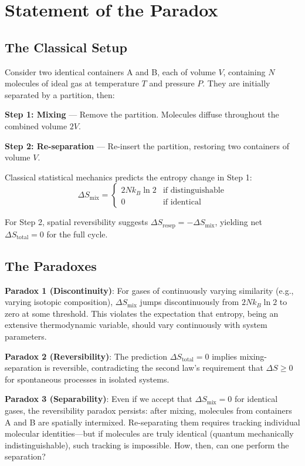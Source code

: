 \section{Statement of the Paradox}

\subsection{The Classical Setup}

Consider two identical containers A and B, each of volume $V$, containing $N$ molecules of ideal gas at temperature $T$ and pressure $P$. They are initially separated by a partition, then:

\textbf{Step 1: Mixing} — Remove the partition. Molecules diffuse throughout the combined volume $2V$.

\textbf{Step 2: Re-separation} — Re-insert the partition, restoring two containers of volume $V$.

Classical statistical mechanics predicts the entropy change in Step 1:
\begin{equation}
\Delta S_{\text{mix}} =
\begin{cases}
2Nk_B \ln 2 & \text{if distinguishable} \\
0 & \text{if identical}
\end{cases}
\label{eq:classical_mixing}
\end{equation}

For Step 2, spatial reversibility suggests $\Delta S_{\text{resep}} = -\Delta S_{\text{mix}}$, yielding net $\Delta S_{\text{total}} = 0$ for the full cycle.

\subsection{The Paradoxes}

\textbf{Paradox 1 (Discontinuity)}: For gases of continuously varying similarity (e.g., varying isotopic composition), $\Delta S_{\text{mix}}$ jumps discontinuously from $2Nk_B \ln 2$ to zero at some threshold. This violates the expectation that entropy, being an extensive thermodynamic variable, should vary continuously with system parameters.

\textbf{Paradox 2 (Reversibility)}: The prediction $\Delta S_{\text{total}} = 0$ implies mixing-separation is reversible, contradicting the second law's requirement that $\Delta S \geq 0$ for spontaneous processes in isolated systems.

\textbf{Paradox 3 (Separability)}: Even if we accept that $\Delta S_{\text{mix}} = 0$ for identical gases, the reversibility paradox persists: after mixing, molecules from containers A and B are spatially intermixed. Re-separating them requires tracking individual molecular identities—but if molecules are truly identical (quantum mechanically indistinguishable), such tracking is impossible. How, then, can one perform the separation?

